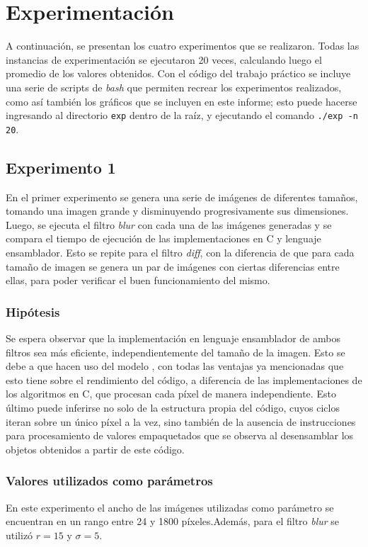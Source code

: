 \section{Experimentación}
	A continuación, se presentan los cuatro experimentos que se realizaron. Todas las instancias de experimentación se ejecutaron 20 veces, calculando luego el promedio de los valores obtenidos. Con el código del trabajo práctico se incluye una serie de scripts de \emph{bash} que permiten recrear los experimentos realizados, como así también los gráficos que se incluyen en este informe; esto puede hacerse ingresando al directorio \texttt{exp} dentro de la raíz, y ejecutando el comando \texttt{./exp -n 20}.

	\subsection{Experimento 1}
		En el primer experimento se genera una serie de imágenes de diferentes tamaños, tomando una imagen grande y disminuyendo progresivamente sus dimensiones.
		Luego, se ejecuta el filtro \emph{blur} con cada una de las imágenes generadas y se compara el tiempo de ejecución de las implementaciones en C y lenguaje ensamblador.
		Esto se repite para el filtro \emph{diff}, con la diferencia de que para cada tamaño de imagen se genera 
		un par de imágenes con ciertas diferencias entre ellas, para poder verificar el buen funcionamiento del mismo.

		\subsubsection*{Hipótesis} 
			Se espera observar que la implementación en lenguaje ensamblador de ambos filtros sea más eficiente, independientemente del tamaño de la imagen. Esto se debe a que hacen uso del modelo , con todas las ventajas ya mencionadas que esto tiene sobre el rendimiento del código, a diferencia de las implementaciones de los algoritmos en C, que procesan cada píxel de manera independiente. Esto último puede inferirse no solo de la estructura propia del código, cuyos ciclos iteran sobre un único píxel a la vez, sino también de la ausencia de instrucciones  para procesamiento de valores empaquetados que se observa al desensamblar los objetos obtenidos a partir de este código.

		\subsubsection*{Valores utilizados como parámetros} 		
			En este experimento el ancho de las imágenes utilizadas como parámetro se encuentran en un rango entre 24 y 1800 píxeles.Además, para el filtro \emph{blur} se utilizó $r = 15$ y $\sigma = 5$.

